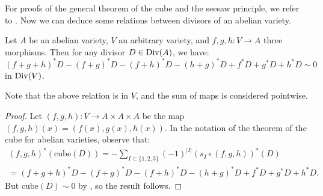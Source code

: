 For proofs of the general theorem of the cube and the seesaw principle, we refer to \cite{Mumford_1970}.
Now we can deduce some relations between divisors of an abelian variety.
\begin{corollary}\label{threemorphisms}
	Let $A$ be an abelian variety, $V$ an arbitrary variety, and $f,g,h:V\rightarrow A$ three morphisms. Then for any divisor $D\in\operatorname{Div}(A)$, we have:
	\begin{equation*}
		(f+g+h)^*D-(f+g)^*D-(f+h)^*D-(h+g)^*D+f^*D+g^*D+h^*D\sim 0
	\end{equation*}
	in $\operatorname{Div}(V)$.
\end{corollary}
Note that the above relation is in $V$, and the sum of maps is considered pointwise.
\begin{proof}
	Let $(f,g,h):V\rightarrow A\times A\times A$ be the map $(f,g,h)(x)=(f(x),g(x),h(x))$. In the notation of the theorem of the cube for abelian varieties, observe that:
	\begin{gather*}
		(f,g,h)^*(\text{cube}(D))=-\sum_{I\subset\{1,2,3\}}(-1)^{|I|}(s_I\circ(f,g,h))^*(D)\\
		=(f+g+h)^*D-(f+g)^*D-(f+h)^*D-(h+g)^*D+f^*D+g^*D+h^*D.
	\end{gather*}
	But $\text{cube}(D)\sim 0$ by , so the result follows.
\end{proof}

